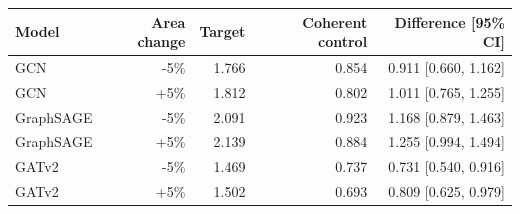 \begin{tabular}{lrrrr}\toprule Model & Area change & Target & Coherent control & Difference [95\% CI] \\ \midrule
GCN & -5\% & 1.766 & 0.854 & 0.911 [0.660, 1.162] \\
GCN & +5\% & 1.812 & 0.802 & 1.011 [0.765, 1.255] \\
GraphSAGE & -5\% & 2.091 & 0.923 & 1.168 [0.879, 1.463] \\
GraphSAGE & +5\% & 2.139 & 0.884 & 1.255 [0.994, 1.494] \\
GATv2 & -5\% & 1.469 & 0.737 & 0.731 [0.540, 0.916] \\
GATv2 & +5\% & 1.502 & 0.693 & 0.809 [0.625, 0.979] \\
\bottomrule
\end{tabular}
